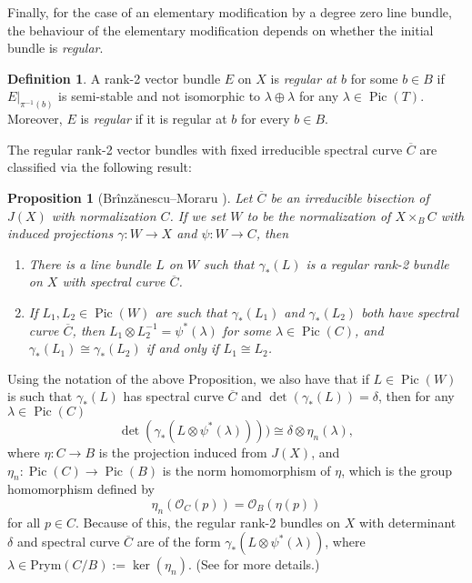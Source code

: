 \documentclass{article}[12pt]
\newtheorem{proposition}[theorem]{Proposition}
\theoremstyle{definition}
\newtheorem{definition}[theorem]{Definition}
\theoremstyle{remark}
\numberwithin{equation}{section}
\newcommand \mc{\mathcal}
\DeclareMathOperator{\Pic}{Pic}
\begin{document}
Finally, for the case of an elementary modification by a degree zero line bundle, the behaviour of the elementary modification depends on whether the initial bundle is \emph{regular}.
\begin{definition}
	A rank-2 vector bundle $E$ on $X$ is \emph{regular at $b$} for some $b \in B$ if $E|_{\pi^{-1}(b)}$ is semi-stable and not isomorphic to $\lambda \oplus \lambda$ for any $\lambda \in \Pic(T)$. Moreover, $E$ is \emph{regular} if it is regular at $b$ for every $b \in B$.
\end{definition}
The regular rank-2 vector bundles with fixed irreducible spectral curve $\overline{C}$ are classified via the following result:
\begin{proposition}[Br\^inz\u anescu--Moraru \cite{BrMoFM}]\label{prym}
	Let $\overline{C}$ be an irreducible bisection of $J(X)$ with normalization $C$. If we set $W$ to be the normalization of $X\times_B C$ with induced projections $\gamma:W\to X$ and $\psi:W\to C$, then 
	\begin{enumerate}
		\item[i.] There is a line bundle $L$ on $W$ such that $\gamma_*(L)$ is a regular rank-2 bundle on $X$ with spectral curve $\overline{C}$.
		\item[ii.] If $L_1,L_2\in \Pic(W)$ are such that $\gamma_*(L_1)$ and $\gamma_*(L_2)$ both have spectral curve $\overline{C}$, then $L_1\otimes L_2^{-1}=\psi^*(\lambda)$ for some $\lambda \in \Pic(C)$, and $\gamma_*(L_1)\cong \gamma_*(L_2)$ if and only if $L_1\cong L_2$.
	\end{enumerate} 
\end{proposition}
Using the notation of the above Proposition, we also have that if $L\in \Pic(W)$ is such that $\gamma_*(L)$ has spectral curve $\overline{C}$ and $\det(\gamma_*(L))=\delta$, then for any $\lambda \in \Pic(C)$ $$\det(\gamma_*(L\otimes \psi^*(\lambda))))\cong \delta \otimes \eta_n(\lambda),$$
where $\eta:C\to B$ is the projection induced from $J(X)$, and $\eta_n:\Pic(C)\to \Pic(B)$ is the norm homomorphism of $\eta$, which is the group homomorphism defined by $$\eta_n(\mc{O}_C(p))=\mc{O}_B(\eta(p))$$
for all $p \in C$. Because of this, the regular rank-2 bundles on $X$ with determinant $\delta$ and spectral curve $\overline{C}$ are of the form $\gamma_*(L\otimes \psi^*(\lambda))$, where $\lambda \in \text{Prym}(C/B):=\ker(\eta_n)$. (See \cite[Theorem 4.5]{BrMoFM} for more details.)
\end{document}
